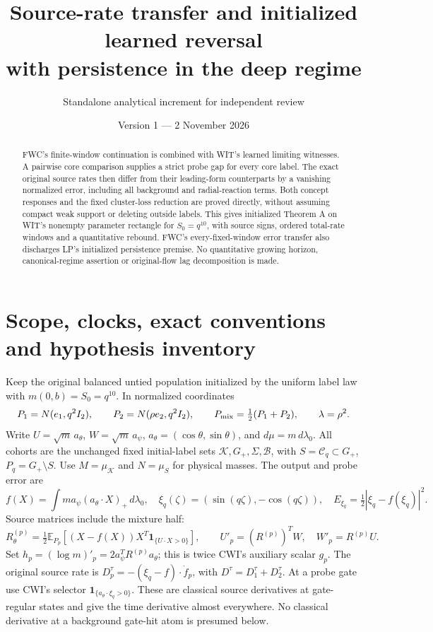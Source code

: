 \documentclass[11pt]{article}
\title{Source-rate transfer and initialized learned reversal\\
with persistence in the deep regime}
\author{Standalone analytical increment for independent review}
\date{Version 1 --- 2 November 2026}
\numberwithin{equation}{section}
\newcommand{\E}{\mathbb E}\newcommand{\dd}{\,d}
\newcommand{\KK}{\mathcal K}\newcommand{\BB}{\mathcal B}
\newcommand{\Gp}{G_+}\newcommand{\dist}{\mathfrak d}
\newcommand{\one}{\mathbf1}\newcommand{\Kfun}{\mathsf K}
\begin{document}
\maketitle
\begin{abstract}
FWC's finite-window continuation is combined with WIT's learned
limiting witnesses. A pairwise core comparison supplies a strict
probe gap for every core label. The exact original source rates
then differ from their leading-form counterparts by a vanishing
normalized error, including all background and radial-reaction terms.
Both concept responses and the fixed cluster-loss reduction are
proved directly, without assuming compact weak support or deleting
outside labels. This gives initialized Theorem A on WIT's nonempty
parameter rectangle for \(S_0=q^{10}\), with source signs,
ordered total-rate windows and a quantitative rebound.
FWC's every-fixed-window error transfer also discharges LP's
initialized persistence premise. No quantitative growing horizon,
canonical-regime assertion or original-flow lag decomposition is made.
\end{abstract}

\section{Scope, clocks, exact conventions and hypothesis inventory}
\label{an07rtav1:inventory}
Keep the original balanced untied population initialized by the
uniform label law with \(m(0,b)=S_0=q^{10}\).
In normalized coordinates
\[
 P_1=N(e_1,q^2I_2),\qquad P_2=N(\rho e_2,q^2I_2),\qquad
 P_{\rm mix}=\tfrac12(P_1+P_2),\qquad \lambda=\rho^2.
\]
Write \(U=\sqrt m\,a_\theta\), \(W=\sqrt m\,a_\psi\),
\(a_\theta=(\cos\theta,\sin\theta)\), and
\(d\mu=m\,d\lambda_0\). All cohorts are the unchanged fixed
initial-label sets \(\KK,\Gp,\Sigma,\BB\), with
\(S=\mathcal C_q\subset\Gp\), \(P_q=\Gp\setminus S\).
Use \(M=\mu_\KK\) and \(N=\mu_S\) for physical masses.
The output and probe error are
\[
 f(X)=\int m a_\psi(a_\theta\cdot X)_+\dd\lambda_0,
 \quad \xi_q(\zeta)=(\sin(q\zeta),-\cos(q\zeta)),
 \quad E_{\xi_q}=\tfrac12|\xi_q-f(\xi_q)|^2.
\]
Source matrices include the mixture half:
\begin{equation}
 R^{(p)}_\theta=\tfrac12\E_{P_p}[(X-f(X))X^T
                    \one_{\{U\cdot X>0\}}],\qquad
 U'_p=(R^{(p)})^TW,\quad W'_p=R^{(p)}U.
 \label{an07rtav1:sourceconvention}
\end{equation}
Set \(h_p=(\log m)'_p=2a_\psi^TR^{(p)}a_\theta\);
this is twice CWI's auxiliary scalar \(g_p\).
The original source rate is
\(D_p^\tau=-(\xi_q-f)\cdot\dot f_p\), with
\(D^\tau=D_1^\tau+D_2^\tau\). At a probe gate use CWI's
selector \(\one_{\{a_\theta\cdot\xi_q>0\}}\).
These are classical source derivatives at gate-regular states and
give the time derivative almost everywhere. No classical derivative
at a background gate-hit atom is presumed below.
\end{document}
